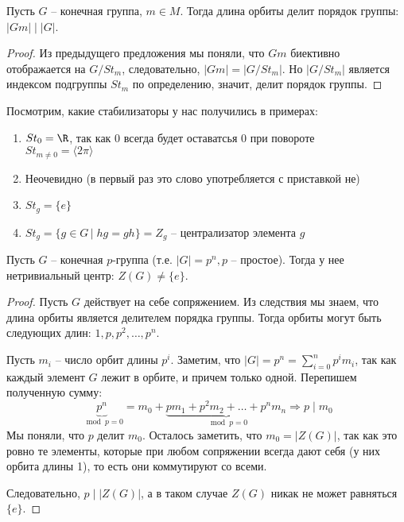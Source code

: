 \begin{follow}
    Пусть $G$ -- конечная группа, $m \in M$.
    Тогда длина орбиты делит порядок группы: $|Gm| \mid |G|$.
\end{follow}
\begin{proof}
    Из предыдущего предложения мы поняли, что $Gm$ биективно отображается на $G / St_m$, следовательно, $|Gm| = |G / St_m|$.
    Но $|G / St_m|$ является индексом подгруппы $St_m$ по определению, значит, делит порядок группы.
\end{proof}

Посмотрим, какие стабилизаторы у нас получились в примерах:
\begin{enumerate}
    \item $St_0 = \R$, так как 0 всегда будет оставатсья 0 при повороте \\ $St_{m \neq 0} = \langle 2\pi \rangle$
    \item Неочевидно (в первый раз это слово употребляется с приставкой не)
    \item $St_g = \{ e \}$
    \item $St_g = \{ g \in G \, | \; hg = gh \} = Z_g$ -- централизатор элемента $g$ 
\end{enumerate}

\begin{theorem-non}
    Пусть $G$ -- конечная $p$-группа (т.е. $|G| = p^n, p$ -- простое).
    Тогда у нее нетривиальный центр: $Z(G) \neq \{ e \}$.
\end{theorem-non}
\begin{proof}
    Пусть $G$ действует на себе сопряжением. 
    Из следствия мы знаем, что длина орбиты является делителем порядка группы. 
    Тогда орбиты могут быть следующих длин: $1, p, p^2, \dots, p^n$. 

    Пусть $m_i$ -- число орбит длины $p^i$. 
    Заметим, что $|G| = p^n = \sum\limits_{i = 0}^n p^im_i$, так как каждый элемент $G$ лежит в орбите, и причем только одной.
    Перепишем полученную сумму: \[ \underbrace{p^n}_{\mod p = 0} = m_0 + \underbrace{pm_1 + p^2m_2 + \dots + p^nm_n}_{\mod p = 0} \Rightarrow p \mid m_0 \]
    Мы поняли, что $p$ делит $m_0$. 
    Осталось заметить, что $m_0 = |Z(G)|$, так как это ровно те элементы, которые при любом сопряжении всегда дают себя (у них орбита длины 1), то есть они коммутируют со всеми.

    Следовательно, $p \mid |Z(G)|$, а в таком случае $Z(G)$ никак не может равняться $\{ e \}$.
\end{proof}

